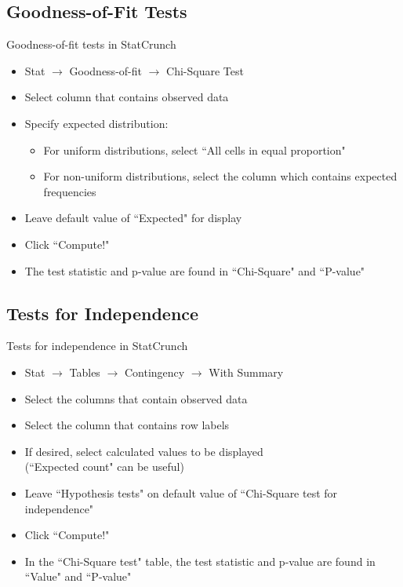 \documentclass[aspectratio=169]{beamer}
\begin{document}
\subsection{Goodness-of-Fit Tests}

\begin{frame}{Goodness-of-fit tests in StatCrunch}

\begin{block}{}
\large
\begin{itemize}
\item Stat $\to$ Goodness-of-fit $\to$ Chi-Square Test
\item Select column that contains observed data
\item Specify expected distribution:
\begin{itemize}
\item For uniform distributions, select ``All cells in equal proportion"
\item For non-uniform distributions, select the column which contains expected frequencies
\end{itemize}
\item Leave default value of ``Expected" for display
\item Click ``Compute!"
\item The test statistic and p-value are found in ``Chi-Square" and ``P-value"
\end{itemize}
\end{block}
\end{frame}



%
%
\subsection{Tests for Independence}


\begin{frame}{Tests for independence in StatCrunch}
\begin{block}{}
\large
\begin{itemize}
\item Stat $\to$ Tables $\to$ Contingency $\to$ With Summary
\item Select the columns that contain observed data
\item Select the column that contains row labels
\item If desired, select calculated values to be displayed\\(``Expected count" can be useful)
\item Leave ``Hypothesis tests" on default value of ``Chi-Square test for independence"
\item Click ``Compute!"
\item In the ``Chi-Square test" table, the test statistic and p-value are found in ``Value" and ``P-value"
\end{itemize}
\end{block}

\end{frame}
\end{document}
